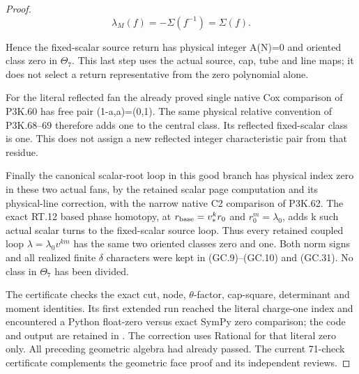 \begin{proof}
\[
                  \lambda_M(f)=-\Sigma(f^{-1})=\Sigma(f).
 \tag{GC.34}
\]

Hence the fixed-scalar source return has physical integer
A(N)=0 and oriented class zero in \(\Theta_7\). This last step uses
the actual source, cap, tube and line maps; it does not select
a return representative from the zero polynomial alone.

For the literal reflected fan the already proved single
native Cox comparison of P3K.60 has free pair (1-a,a)=(0,1).
The same physical relative convention of P3K.68--69 therefore
adds one to the central class. Its reflected fixed-scalar
class is one. This does not assign a new reflected integer
characteristic pair from that residue.

Finally the canonical scalar-root loop in this good branch
has physical index zero in these two actual fans, by the
retained scalar page computation and its physical-line
correction, with the narrow native C2 comparison of P3K.62.
The exact RT.12 based phase homotopy, at
\(r_{\rm base}=v_*^k r_0\) and \(r_0^m=\lambda_0\), adds k such actual scalar
turns to the fixed-scalar source loop. Thus every retained
coupled loop \(\lambda=\lambda_0v^{km}\) has the same two oriented
classes zero and one. Both norm signs and all realized finite
\(\delta\) characters were kept in (GC.9)--(GC.10) and (GC.31).
No class in \(\Theta_7\) has been divided.

The certificate  checks the
exact cut, node, \(\theta\)-factor, cap-square, determinant and
moment identities. Its first extended run reached the literal
charge-one index and encountered a Python float-zero versus
exact SymPy zero comparison; the code and output are retained
in . The
correction uses Rational for that literal zero only. All
preceding geometric algebra had already passed. The current
71-check certificate complements the geometric face proof
and its independent reviews.
\end{proof}
